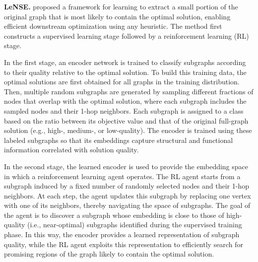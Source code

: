 

\textbf{LeNSE.}  \citet{ireland2022lense} proposed a framework for learning to extract a small portion of the original graph that is most likely to contain the optimal solution, enabling efficient downstream optimization using any heuristic. The method first constructs a supervised learning stage followed by a reinforcement learning (RL) stage.

In the first stage, an encoder network is trained to classify subgraphs according to their quality relative to the optimal solution. To build this training data, the optimal solutions are first obtained for all graphs in the training distribution. Then, multiple random subgraphs are generated by sampling different fractions of nodes that overlap with the optimal solution, where each subgraph includes the sampled nodes and their 1-hop neighbors. Each subgraph is assigned to a class based on the ratio between its objective value and that of the original full-graph solution (e.g., high-, medium-, or low-quality). The encoder is trained using these labeled subgraphs so that its embeddings capture structural and functional information correlated with solution quality.

In the second stage, the learned encoder is used to provide the embedding space in which a reinforcement learning agent operates. The RL agent starts from a subgraph induced by a fixed number of randomly selected nodes and their 1-hop neighbors. At each step, the agent updates this subgraph by replacing one vertex with one of its neighbors, thereby navigating the space of subgraphs. The goal of the agent is to discover a subgraph whose embedding is close to those of high-quality (i.e., near-optimal) subgraphs identified during the supervised training phase. In this way, the encoder provides a learned representation of subgraph quality, while the RL agent exploits this representation to efficiently search for promising regions of the graph likely to contain the optimal solution.


